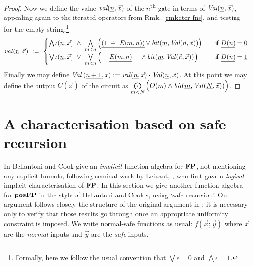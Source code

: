 \documentclass{lmcs}
\begin{document}
\begin{proof}
	\noindent
	Now we define the value $\mathit{val} (\underline{n}, \vec x)$ of the $n$\textsuperscript{th} gate in terms of $\mathit{Val} (\underline{n} , \vec x)$, appealing again to the iterated operators from Rmk.~\ref{rmk:iter-fns}, and testing for the empty string:\footnote{Formally, here we follow the usual convention that $\bigvee \epsilon = 0 $ and $\bigwedge \epsilon = 1$.}
	\[
	\val (\unary{n},\vec x)
	\ \dfn\ 
	\begin{cases}
	\bigwedge \iota (\unary{n}, \vec x) \ \wedge \  \bigwedge\limits_{m<n} \left(\unary{\left(1 \subtr E(m , n)\right)} \vee \bit (\unary m  , \Val (\vec n , \vec x)) \right) & \quad \text{if $\unary{D( n)} = \unary 0$}\\
	\bigvee \iota (\unary{n}, \vec x) \ \vee \ \bigvee\limits_{m<n} \left( \hspace{1.25em} \unary{E( m, n)} \hspace{1.25em} \wedge \bit (\unary m , \Val (\vec n , \vec x))\right) &\quad \text{if $\unary{D( n)} = \unary 1$}
	\end{cases}
	\]
	Finally we may define $\mathit{Val}\left(\underline{n+1}, \vec x\right) := \mathit{val} (\underline{n} , \vec x) \cdot \mathit{Val} (\underline{n} , \vec x)$.
	At this point we may define the output $C(\vec x)$ of the circuit as $\mathop{\bigodot}\limits_{m<N} \left( \underline{O( m)} \wedge \mathit{bit} (\underline{m} , \mathit{Val} (\underline{N} , \vec x) ) \right)$.
\end{proof}



\section{A characterisation based on safe recursion}
\label{sect:safe-recursion}
In \cite{BelCoo92} Bellantoni and Cook give an \emph{implicit} function algebra for $\mathbf{FP}$, not mentioning any explicit bounds, following seminal work by Leivant, \cite{Leivant91:delin-comp:feas,Leivant94:delin-ptime}, who first gave a \emph{logical} implicit characterisation of $\mathbf{FP}$.
%
In this section we give another function algebra for $\mathbf{pos}\mathbf{FP}$ in the style of Bellantoni and Cook's, using `safe recursion'. 
Our argument follows closely the structure of the original argument in \cite{BelCoo92};
 it is necessary only to verify that those results go through once an appropriate uniformity constraint is imposed.
We write normal-safe functions as usual: $f(\vec x; \vec y)$ where $\vec x$ are the \emph{normal} inputs and $\vec y$ are the \emph{safe} inputs.
\end{document}
